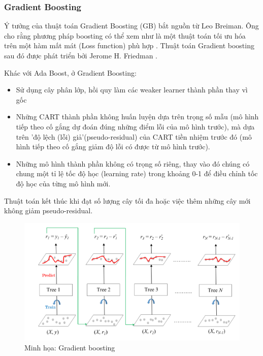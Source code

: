         
    \subsubsection{Gradient Boosting}
        Ý tưởng của thuật toán Gradient Boosting (GB) bắt nguồn từ Leo Breiman. Ông cho rằng phương pháp boosting có thể xem như là một thuật toán tối ưu hóa trên một hàm mất mát (Loss function) phù hợp \cite{breiman1997arcing}. Thuật toán Gradient boosting sau đó được phát triển bởi Jerome H. Friedman \cite{friedman2001greedy} \cite{friedman2002stochastic}.
        
        Khác với Ada Boost, ở Gradient Boosting:
            \begin{itemize}
                \item Sử dụng cây phân lớp, hồi quy làm các weaker learner thành phần thay vì gốc
            
                \item Những CART thành phần không huấn luyện dựa trên trọng số mẫu (mô hình tiếp theo cố gắng dự đoán đúng những điểm lỗi của mô hình trước), mà dựa trên  'độ lệch (lỗi) giả'(pseudo-residual) của CART tiền nhiệm trước đó (mô hình tiếp theo cố gắng giảm độ lỗi có được từ mô hình trước).
                
                \item Những mô hình thành phần không có trọng số riêng, thay vào đó chúng có chung một tỉ lệ tốc độ học (learning rate) trong khoảng {0-1} để điều chỉnh tốc độ học của từng mô hình mới.
            \end{itemize}
            
        Thuật toán kết thúc khi đạt số lượng cây tối đa hoặc việc thêm những cây mới không giảm pseudo-residual.
            
        \begin{figure}[htp]
        \centering
        \includegraphics[width=10 cm,]{images/gradientboosting.png}
        \caption{Minh họa: Gradient boosting \cite{g4g_Gb}}
        \label{fig:gb}
        \end{figure}

